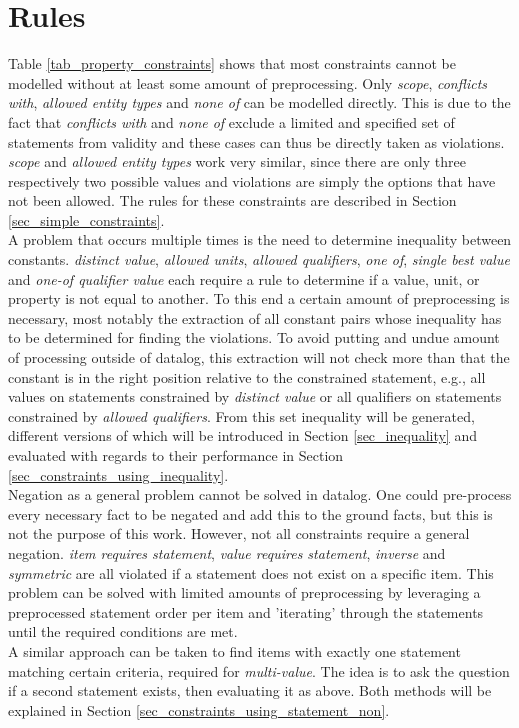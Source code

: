 \documentclass[hyperref,bachelorofscience,fleqn]{cgvpub}
\begin{document}
\section{Rules}
Table \ref{tab_property_constraints} shows that most constraints cannot be modelled without at least some amount of preprocessing. Only \emph{scope}, \emph{conflicts with}, \emph{allowed entity types} and \emph{none of} can be modelled directly. This is due to the fact that \emph{conflicts with} and \emph{none of} exclude a limited and specified set of statements from validity and these cases can thus be directly taken as violations. \emph{scope} and \emph{allowed entity types} work very similar, since there are only three respectively two possible values and violations are simply the options that have not been allowed. The rules for these constraints are described in Section \ref{sec_simple_constraints}.\\

A problem that occurs multiple times is the need to determine inequality between constants. \emph{distinct value}, \emph{allowed units}, \emph{allowed qualifiers}, \emph{one of}, \emph{single best value} and \emph{one-of qualifier value} each require a rule to determine if a value, unit, or property is not equal to another. To this end a certain amount of preprocessing is necessary, most notably the extraction of all constant pairs whose inequality has to be determined for finding the violations. To avoid putting and undue amount of processing outside of datalog, this extraction will not check more than that the constant is in the right position relative to the constrained statement, e.g., all values on statements constrained by \emph{distinct value} or all qualifiers on statements constrained by \emph{allowed qualifiers}. From this set inequality will be generated, different versions of which will be introduced in Section \ref{sec_inequality} and evaluated with regards to their performance in Section \ref{sec_constraints_using_inequality}.\\

Negation as a general problem cannot be solved in datalog. One could pre-process every necessary fact to be negated and add this to the ground facts, but this is not the purpose of this work. However, not all constraints require a general negation. \emph{item requires statement}, \emph{value requires statement}, \emph{inverse }and \emph{symmetric} are all violated if a statement does not exist on a specific item. This problem can be solved with limited amounts of preprocessing by leveraging a preprocessed statement order per item and 'iterating' through the statements until the required conditions are met.\\
A similar approach can be taken to find items with exactly one statement matching certain criteria, required for 	\emph{multi-value}. The idea is to ask the question if a second statement exists, then evaluating it as above. Both methods will be explained in Section \ref{sec_constraints_using_statement_non}.
\end{document}
